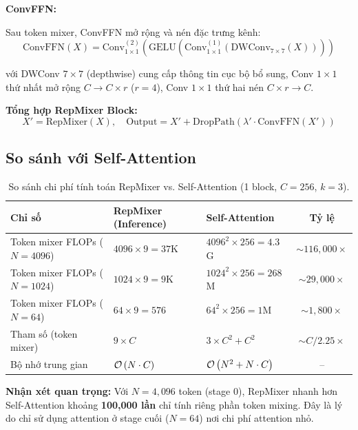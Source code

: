\textbf{ConvFFN:}

Sau token mixer, ConvFFN mở rộng và nén đặc trưng kênh:
\begin{equation}
    \text{ConvFFN}(X) = \text{Conv}_{1\times1}^{(2)}\left(\text{GELU}\left(\text{Conv}_{1\times1}^{(1)}\left(\text{DWConv}_{7\times7}(X)\right)\right)\right)
\end{equation}

\noindent với DWConv $7 \times 7$ (depthwise) cung cấp thông tin cục bộ bổ sung, Conv $1 \times 1$ thứ nhất mở rộng $C \to C \times r$ ($r = 4$), Conv $1 \times 1$ thứ hai nén $C \times r \to C$.

\textbf{Tổng hợp RepMixer Block:}
\begin{equation}
    X' = \text{RepMixer}(X), \quad \text{Output} = X' + \text{DropPath}(\lambda' \cdot \text{ConvFFN}(X'))
\end{equation}

\subsection{So sánh với Self-Attention}
\label{subsec:repmixer_vs_attention}

\begin{table}[H]
\centering
\caption{So sánh chi phí tính toán RepMixer vs. Self-Attention (1 block, $C=256$, $k=3$).}
\label{tab:repmixer_vs_attention}
\begin{tabularx}{\textwidth}{X X X c}
\toprule
\textbf{Chỉ số} & \textbf{RepMixer (Inference)} & \textbf{Self-Attention} & \textbf{Tỷ lệ} \\
\midrule
Token mixer FLOPs ($N = 4096$) & $4096 \times 9 = 37$K & $4096^2 \times 256 = 4.3$G & $\sim 116{,}000\times$ \\
Token mixer FLOPs ($N = 1024$) & $1024 \times 9 = 9$K & $1024^2 \times 256 = 268$M & $\sim 29{,}000\times$ \\
Token mixer FLOPs ($N = 64$) & $64 \times 9 = 576$ & $64^2 \times 256 = 1$M & $\sim 1{,}800\times$ \\
Tham số (token mixer) & $9 \times C$ & $3 \times C^2 + C^2$ & $\sim C/2.25\times$ \\
Bộ nhớ trung gian & $\mathcal{O}\left(N \cdot C\right)$ & $\mathcal{O}\left(N^2 + N \cdot C\right)$ & -- \\
\bottomrule
\end{tabularx}
\end{table}

\textbf{Nhận xét quan trọng:} Với $N = 4{,}096$ token (stage 0), RepMixer nhanh hơn Self-Attention khoảng \textbf{100,000 lần} chỉ tính riêng phần token mixing. Đây là lý do \fastvit{} chỉ sử dụng attention ở stage cuối ($N = 64$) nơi chi phí attention nhỏ.

